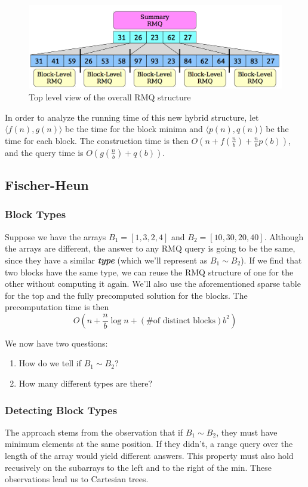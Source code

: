 \documentclass[11pt, oneside]{article}
\newcommand{\emphasis}[1]{\textbf{\textit{#1}}}
\begin{document}
\begin{figure}[h!]
\centering
\includegraphics[scale=0.25]{summary}
\caption{Top level view of the overall RMQ structure}
\end{figure}

In order to analyze the running time of this new hybrid structure, let
\( \langle f(n), g(n) \rangle \) be the time for the block minima and
\( \langle p(n), q(n) \rangle \) be the time for each block.
The construction time is then \( O(n + f(\frac{n}{b}) + \frac{n}{b} p(b)) \),
and the query time is \( O(g(\frac{n}{b}) + q(b)) \).

\subsection{Fischer-Heun}

\subsubsection{Block Types}
Suppose we have the arrays \( B_1 = [1, 3, 2, 4] \) and \( B_2 = [10, 30, 20, 40] \).
Although the arrays are different, the answer to any RMQ query is going to be the same,
since they have a similar \emphasis{type} (which we'll represent as \( B_1 \sim B_2 \)).
If we find that two blocks have the same type, we can reuse the RMQ structure of one
for the other without computing it again. We'll also use the aforementioned sparse table
for the top and the fully precomputed solution for the blocks.
The precomputation time is then
\[ O(n + \frac{n}{b} \log n + (\text{\# of distinct blocks}) b^2) \]

We now have two questions:
\begin{enumerate}
  \item How do we tell if \( B_1 \sim B_2 \)?
  \item How many different types are there?
\end{enumerate}

\subsubsection{Detecting Block Types}
The approach stems from the observation that if \( B_1 \sim B_2 \), they must have minimum elements
at the same position. If they didn't, a range query over the length of the array would yield different answers.
This property must also hold recusively on the subarrays to the left and to the right of the min.
These observations lead us to Cartesian trees.
\end{document}
